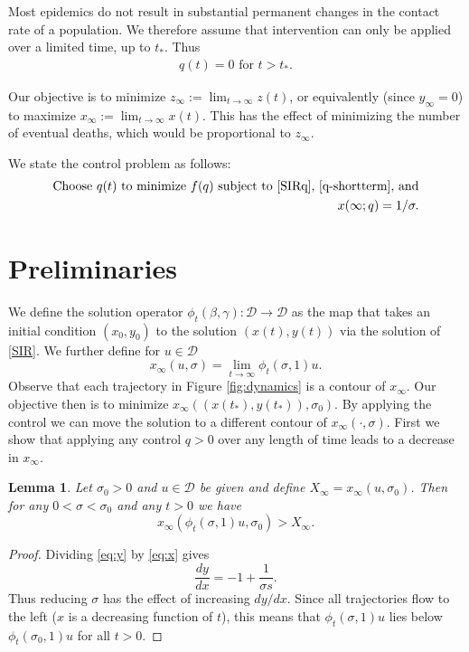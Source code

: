 \documentclass[english,12pt]{article}
\newtheorem{lemma}{Lemma}
\newcommand{\Rnot}{\sigma_0}
\newcommand{\Sinf}{x_\infty}
\newcommand{\dom}{{\mathcal D}}
\begin{document}
Most epidemics do not result in substantial permanent changes in the contact rate of
a population.  We therefore assume that intervention can only be applied over a limited
time, up to $t_*$.  Thus 
\begin{align} \label{q-shortterm}
    q(t)=0 \text{ for } t>t_*.
\end{align}

Our objective is to minimize $z_\infty := \lim_{t \to \infty} z(t)$, or equivalently
(since $y_\infty=0$)
to maximize $\Sinf := \lim_{t \to \infty} x(t)$.  This has the effect of minimizing
the number of eventual deaths, which would be proportional to $z_\infty$.

We state the control problem as follows:
\begin{align}
\text{Choose } q(t) \text{ to minimize } f(q) \text{ subject to \eqref{SIRq}, \eqref{q-shortterm}, and} \\
x(\infty;q) = 1/\sigma.
\end{align}


\section{Preliminaries}
We define the solution operator $\phi_t(\beta,\gamma): \dom \to \dom$ as the map
that takes an initial condition $(x_0,y_0)$ to the solution $(x(t),y(t))$
via the solution of \eqref{SIR}.  We further define for $u\in\dom$
$$
    x_\infty(u,\sigma) = \lim_{t\to\infty} \phi_t(\sigma,1)u.
$$
Observe that each trajectory in Figure \ref{fig:dynamics} is a contour of $x_\infty$.
Our objective then is to minimize $x_\infty((x(t_*),y(t_*)),\Rnot)$.
By applying the control we can move the solution to a different contour of
$x_\infty(\cdot,\sigma)$.  First we show that applying any control $q>0$ over
any length of time leads to a decrease in $x_\infty$.

\begin{lemma}
Let $\Rnot>0$ and $u\in\dom$ be given and define $X_\infty = x_\infty(u,\Rnot)$.
Then for any $0<\sigma<\Rnot$ and any $t>0$ we have
$$
    x_\infty(\phi_t(\sigma,1)u,\Rnot) > X_\infty.
$$
\end{lemma}
\begin{proof}
    Dividing \eqref{eq:y} by \eqref{eq:x} gives
    $$
        \frac{dy}{dx} = -1 + \frac{1}{\sigma s}.
    $$
    Thus reducing $\sigma$ has the effect of increasing $dy/dx$.
    Since all trajectories flow to the left ($x$ is a decreasing function of $t$),
    this means that $\phi_t(\sigma,1)u$ lies below $\phi_t(\Rnot,1)u$ for all $t>0$.
\end{proof}
\end{document}
